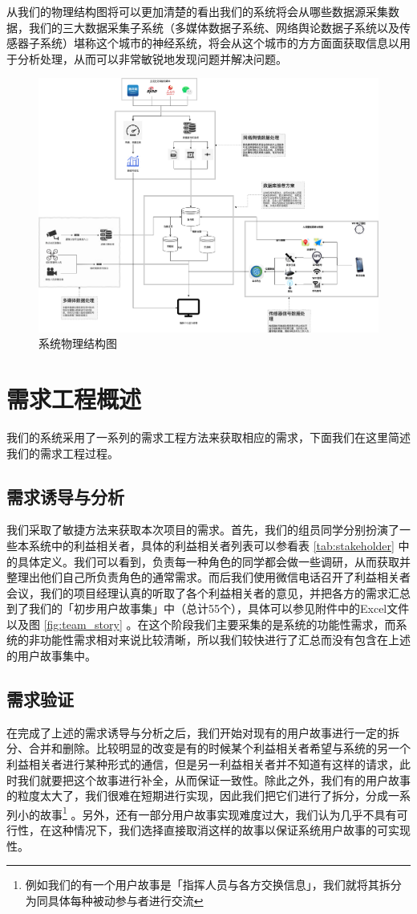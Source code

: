\documentclass{ctexrep}
\begin{document}
从我们的物理结构图将可以更加清楚的看出我们的系统将会从哪些数据源采集数据，我们的三大数据采集子系统（多媒体数据子系统、网络舆论数据子系统以及传感器子系统）堪称这个城市的神经系统，将会从这个城市的方方面面获取信息以用于分析处理，从而可以非常敏锐地发现问题并解决问题。
\begin{figure}[H]
	\centering
	\includegraphics[scale=0.18]{img/physical.png}
	\caption{系统物理结构图}
\end{figure}
\section{需求工程概述}
我们的系统采用了一系列的需求工程方法来获取相应的需求，下面我们在这里简述我们的需求工程过程。
\subsection{需求诱导与分析}
我们采取了敏捷方法来获取本次项目的需求。首先，我们的组员同学分别扮演了一些本系统中的利益相关者，具体的利益相关者列表可以参看表 \ref{tab:stakeholder} 中的具体定义。我们可以看到，负责每一种角色的同学都会做一些调研，从而获取并整理出他们自己所负责角色的通常需求。而后我们使用微信电话召开了利益相关者会议，我们的项目经理认真的听取了各个利益相关者的意见，并把各方的需求汇总到了我们的「初步用户故事集」中（总计55个），具体可以参见附件中的Excel文件以及图 \ref{fig:team_story} 。在这个阶段我们主要采集的是系统的功能性需求，而系统的非功能性需求相对来说比较清晰，所以我们较快进行了汇总而没有包含在上述的用户故事集中。
\subsection{需求验证}
在完成了上述的需求诱导与分析之后，我们开始对现有的用户故事进行一定的拆分、合并和删除。比较明显的改变是有的时候某个利益相关者希望与系统的另一个利益相关者进行某种形式的通信，但是另一利益相关者并不知道有这样的请求，此时我们就要把这个故事进行补全，从而保证一致性。除此之外，我们有的用户故事的粒度太大了，我们很难在短期进行实现，因此我们把它们进行了拆分，分成一系列小的故事\footnote{例如我们的有一个用户故事是「指挥人员与各方交换信息」，我们就将其拆分为同具体每种被动参与者进行交流} 。另外，还有一部分用户故事实现难度过大，我们认为几乎不具有可行性，在这种情况下，我们选择直接取消这样的故事以保证系统用户故事的可实现性。
\end{document}
